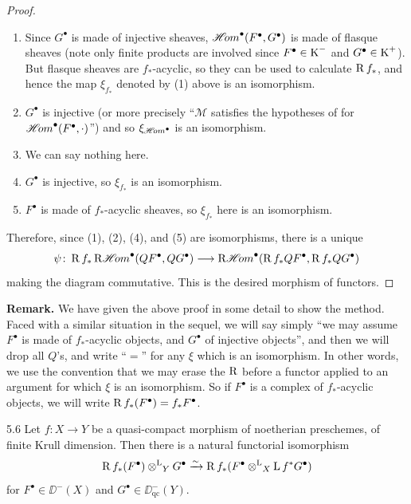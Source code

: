 \begin{proof}
\begin{enumerate}
\item[(1)] Since $G^\bullet$ is made of injective sheaves, $\mathop{\mathscr{H}\!om}\nolimits^\bullet(F^\bullet,G^\bullet)$ is made of flasque sheaves \cite[\nopp II,~7.3.2]{G} (note only finite products are involved since $F^\bullet\in\operatorname{K}^-$ and $G^\bullet\in\operatorname{K}^+$). But flasque sheaves are $f_*$-acyclic, so they can be used to calculate $\operatorname{R} f_*$, and hence the map $\xi_{f_*}$ denoted by (1) above is an isomorphism.
\item[(2)] $G^\bullet$ is injective (or more precisely ``$\mathcal{M}$ satisfies the hypotheses of  for $\mathop{\mathscr{H}\!om}\nolimits^\bullet(F^\bullet,\cdot)$'') and so $\xi_{\mathop{\mathscr{H}\!om}\nolimits^\bullet}$ is an isomorphism.
\item[(3)] We can say nothing here.
\item[(4)] $G^\bullet$ is injective, so $\xi_{f_*}$ is an isomorphism.
\item[(5)] $F^\bullet$ is made of $f_*$-acyclic sheaves, so $\xi_{f_*}$ here is an isomorphism.
\end{enumerate}

Therefore, since (1), (2), (4), and (5) are isomorphisms, there is a unique
\[
\psi\colon \operatorname{R} f_* \mathop{\mathrm{R}\mathscr{H}\!om}\nolimits^\bullet(QF^\bullet,QG^\bullet) \longrightarrow \mathop{\mathrm{R}\mathscr{H}\!om}\nolimits^\bullet(\operatorname{R} f_*QF^\bullet, \operatorname{R} f_*QG^\bullet)
\]
making the diagram commutative. This is the desired morphism of functors.
\end{proof}

\textbf{Remark.}
We have given the above proof in some detail to show the method. Faced with a similar situation in the sequel, we will say simply ``we may assume $F^\bullet$ is made of $f_*$-acyclic objects, and $G^\bullet$ of injective objects'', and then we will drop all $Q$'s, and write ``$=$'' for any $\xi$ which is an isomorphism. In other words, we use the convention that we may erase the $\operatorname{R}$ before a functor applied to an argument for which $\xi$ is an isomorphism. So if $F^\bullet$ is a complex of $f_*$-acyclic objects, we will write $\operatorname{R} f_*(F^\bullet)=f_*F^\bullet$.

\begin{bookproposition}{5.6}\label{prop:2.5.6}
Let $f\colon X\to Y$ be a quasi-compact morphism of noetherian preschemes, of finite Krull dimension. Then there is a natural functorial isomorphism
\[
\operatorname{R} f_*(F^\bullet) \mathbin{\otimes^{\mathrm{L}}}_Y G^\bullet \xrightarrow{\sim} \operatorname{R} f_*(F^\bullet \mathbin{\otimes^{\mathrm{L}}}_X \operatorname{L} f^*G^\bullet)
\]
for $F^\bullet\in\DD^-(X)$ and $G^\bullet\in\DD_{\mathrm{qc}}^-(Y)$.
\end{bookproposition}

